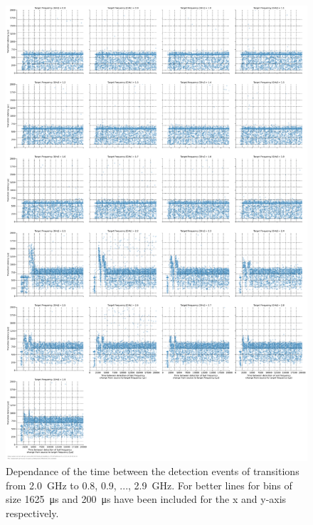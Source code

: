 \begin{figure}[]
    \centering
    \includegraphics[width=\columnwidth]{fig/ftalat/ftalat_scatter_wait_transition_latency_hati_source_2.0.pdf}
    \caption{Dependance of the time between the detection events of transitions from \SI{2.0}{\GHz} to \SI{0.8}{}, \SI{0.9}{}, ..., \SI{2.9}{\GHz}. For better lines for bins of size \SI{1625}{\us} and \SI{200}{\us} have been included for the x and y-axis respectively.}
\end{figure}
